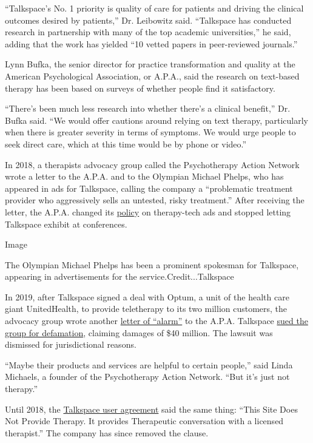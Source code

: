 ``Talkspace's No. 1 priority is quality of care for patients and driving
the clinical outcomes desired by patients,'' Dr. Leibowitz said.
``Talkspace has conducted research in partnership with many of the top
academic universities,'' he said, adding that the work has yielded ``10
vetted papers in peer-reviewed journals.''

Lynn Bufka, the senior director for practice transformation and quality
at the American Psychological Association, or A.P.A., said the research
on text-based therapy has been based on surveys of whether people find
it satisfactory.

``There's been much less research into whether there's a clinical
benefit,'' Dr. Bufka said. ``We would offer cautions around relying on
text therapy, particularly when there is greater severity in terms of
symptoms. We would urge people to seek direct care, which at this time
would be by phone or video.''

In 2018, a therapists advocacy group called the Psychotherapy Action
Network wrote a letter to the A.P.A. and to the Olympian Michael Phelps,
who has appeared in ads for Talkspace, calling the company a
``problematic treatment provider who aggressively sells an untested,
risky treatment.'' After receiving the letter, the A.P.A. changed its
\href{https://irp-cdn.multiscreensite.com/74e2b053/files/uploaded/APA_Tech\%20Advertising\%20Policy_2020_rev.pdf}{policy}
on therapy-tech ads and stopped letting Talkspace exhibit at
conferences.

Image

The Olympian Michael Phelps has been a prominent spokesman for
Talkspace, appearing in advertisements for the
service.Credit...Talkspace

In 2019, after Talkspace signed a deal with Optum, a unit of the health
care giant UnitedHealth, to provide teletherapy to its two million
customers, the advocacy group wrote another
\href{https://mppsyd.com/post/185548172126/mental-health-app-raises-50-million-for}{letter
of ``alarm''} to the A.P.A. Talkspace
\href{https://casetext.com/case/groop-internet-platform-inc-v-psychotherapy-action-network}{sued
the group for defamation}, claiming damages of \$40 million. The lawsuit
was dismissed for jurisdictional reasons.

``Maybe their products and services are helpful to certain people,''
said Linda Michaels, a founder of the Psychotherapy Action Network.
``But it's just not therapy.''

Until 2018, the
\href{https://web.archive.org/web/20180817042804/https://www.talkspace.com/public/user-agreement}{Talkspace
user agreement} said the same thing: ``This Site Does Not Provide
Therapy. It provides Therapeutic conversation with a licensed
therapist.'' The company has since removed the clause.

